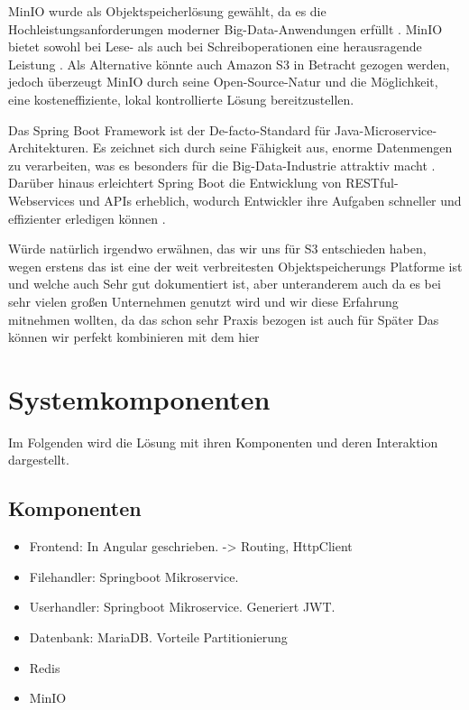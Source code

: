 \documentclass[12pt]{report}
\begin{document}
			MinIO wurde als Objektspeicherlösung gewählt, da es die Hochleistungsanforderungen moderner Big-Data-Anwendungen erfüllt \cite{makris2022performiance}. MinIO bietet sowohl bei Lese- als auch bei Schreiboperationen eine herausragende Leistung \cite{makris2022performance}. Als Alternative könnte auch Amazon S3 in Betracht gezogen werden, jedoch überzeugt MinIO durch seine Open-Source-Natur und die Möglichkeit, eine kosteneffiziente, lokal kontrollierte Lösung bereitzustellen.
			
			Das Spring Boot Framework ist der De-facto-Standard für Java-Microservice-Architekturen. Es zeichnet sich durch seine Fähigkeit aus, enorme Datenmengen zu verarbeiten, was es besonders für die Big-Data-Industrie attraktiv macht \cite{mythily2022analysis}. Darüber hinaus erleichtert Spring Boot die Entwicklung von RESTful-Webservices und APIs erheblich, wodurch Entwickler ihre Aufgaben schneller und effizienter erledigen können \cite{mythily2022analysis}.
			
			Würde natürlich irgendwo erwähnen, das wir uns für S3 entschieden haben, wegen erstens das ist eine der weit verbreitesten Objektspeicherungs Platforme ist und welche auch Sehr gut dokumentiert ist, aber unteranderem auch da es bei sehr vielen großen Unternehmen genutzt wird und wir diese Erfahrung mitnehmen wollten, da das schon sehr Praxis bezogen ist auch für Später
			Das können wir perfekt kombinieren mit dem hier
			
	\section{Systemkomponenten}
		Im Folgenden wird die Lösung mit ihren Komponenten und deren Interaktion dargestellt.
		\subsection{Komponenten}
			\begin{itemize}
				\item Frontend: In Angular geschrieben. -> Routing, HttpClient
				\item Filehandler: Springboot Mikroservice.
				\item Userhandler: Springboot Mikroservice. Generiert JWT.
				\item Datenbank: MariaDB. Vorteile Partitionierung
				\item Redis
				\item MinIO
			\end{itemize}
			
\end{document}
